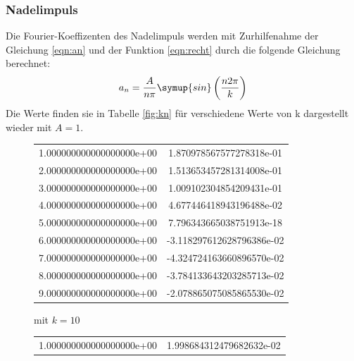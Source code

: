 \subsubsection{Nadelimpuls}
  Die Fourier-Koeffizenten des Nadelimpuls werden mit Zurhilfenahme der Gleichung \eqref{eqn:an} und der Funktion \eqref{eqn:recht} durch die folgende Gleichung berechnet:
  \begin{equation}
    a_n = \frac{A}{n\pi} \symup{sin}\left(\frac{n2\pi}{k}\right)
  \end{equation}
  Die Werte finden sie in Tabelle \ref{fig:kn} für verschiedene Werte von k dargestellt wieder mit $A=1$.
\begin{table}
  \centering
  \caption{Fourier-Koeffizenten eines Nadelimpulses}
  \label{fig:kn}
  \begin{subfigure}{0.48\textwidth}
    \centering
  \label{fig:kn10}
  \begin{tabular}{S[round-precision = 0] S}
    \toprule
      &  \\
    \midrule
    1.000000000000000000e+00 & 1.870978567577278318e-01\\
    2.000000000000000000e+00 & 1.513653457281314008e-01\\
    3.000000000000000000e+00 & 1.009102304854209431e-01\\
    4.000000000000000000e+00 & 4.677446418943196488e-02\\
    5.000000000000000000e+00 & 7.796343665038751913e-18\\
    6.000000000000000000e+00 & -3.118297612628796386e-02\\
    7.000000000000000000e+00 & -4.324724163660896570e-02\\
    8.000000000000000000e+00 & -3.784133643203285713e-02\\
    9.000000000000000000e+00 & -2.078865075085865530e-02\\
    \bottomrule
  \end{tabular}
  \caption{mit $k = 10$}
\end{subfigure}
  \begin{subfigure}{0.48\textwidth}
    \centering
  \label{fig:kn100}
  \begin{tabular}{S[round-precision = 0] S}
    \toprule
      &  \\
    \midrule
    1.000000000000000000e+00 & 1.998684312479682632e-02\\

\end{tabular}
\end{subfigure}
\end{table}
